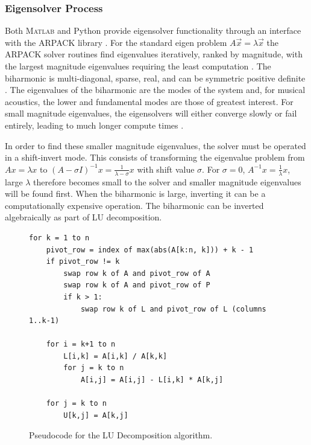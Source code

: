 \subsubsection{Eigensolver Process}

Both M\textsc{atlab} and Python provide eigensolver functionality through an interface with the ARPACK library \cite{scipy_arpack_2025}. For the standard eigen problem $A\vec{x} = \lambda \vec{x}$ the ARPACK solver routines find eigenvalues iteratively, ranked by magnitude, with the largest magnitude eigenvalues requiring the least computation \cite{lehoucq_arpack_1998}. The biharmonic is multi-diagonal, sparse, real, and can be symmetric positive definite \cite{hamilton_magpie_2024}. The eigenvalues of the biharmonic are the modes of the system and, for musical acoustics, the lower and fundamental modes are those of greatest interest. For small magnitude eigenvalues, the eigensolvers will either converge slowly or fail entirely, leading to much longer compute times \cite{scipy_arpack_2025}.

In order to find these smaller magnitude eigenvalues, the solver must be operated in a shift-invert mode. This consists of transforming the eigenvalue problem from $A x = \lambda x$ to $(A- \sigma I)^{-1} x = \frac{1}{\lambda - \sigma} x$ with shift value $\sigma$. For $\sigma = 0$, $A^{-1}x = \frac{1}{\lambda}x$, large $\lambda$ therefore becomes small to the solver and smaller magnitude eigenvalues will be found first. When the biharmonic is large, inverting it can be a computationally expensive operation. The biharmonic can be inverted algebraically as part of LU decomposition.

\begin{figure}[h]
    \centering
    {\footnotesize
    \begin{verbatim}
for k = 1 to n
    pivot_row = index of max(abs(A[k:n, k])) + k - 1
    if pivot_row != k
        swap row k of A and pivot_row of A
        swap row k of A and pivot_row of P
        if k > 1:
            swap row k of L and pivot_row of L (columns 1..k-1)

    for i = k+1 to n
        L[i,k] = A[i,k] / A[k,k]
        for j = k to n
            A[i,j] = A[i,j] - L[i,k] * A[k,j]

    for j = k to n
        U[k,j] = A[k,j]
    \end{verbatim}
    }
    \caption{Pseudocode for the LU Decomposition algorithm.}
    \label{fig:lu-decomp}
\end{figure}

